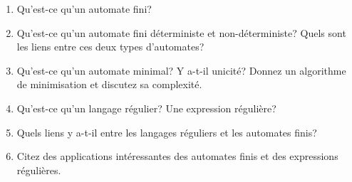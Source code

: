 \documentclass[11pt, a4paper]{article}
\begin{document}
  \begin{enumerate}

    \item Qu'est-ce qu'un automate fini?

    \item Qu'est-ce qu'un automate fini déterministe et
          non-déterministe? Quels sont les liens entre ces deux types
          d'automates?

    \item Qu'est-ce qu'un automate minimal? Y a-t-il unicité? Donnez
          un algorithme de minimisation et discutez sa complexité.

    \item Qu'est-ce qu'un langage régulier? Une expression régulière?

    \item Quels liens y a-t-il entre les langages réguliers et les
          automates finis?

    \item Citez des applications intéressantes des automates finis et
          des expressions régulières.

  \end{enumerate}
\end{document}
